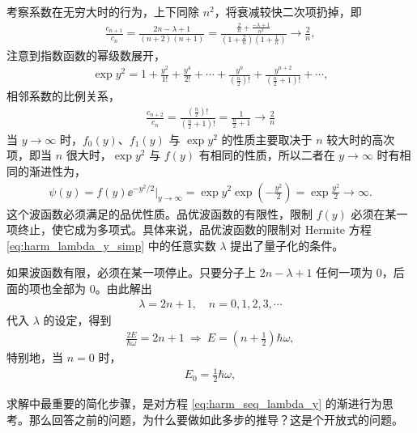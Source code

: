 考察系数在无穷大时的行为，上下同除 $n^2$，将衰减较快二次项扔掉，即
\begin{align}
    \frac{c_{n+1}}{c_n} = \frac{2n - \lambda + 1} { (n+2) (n+1)} = \frac{ \frac{2}{n} + \frac{-\lambda+1}{n^2} } { \left(1+\frac 2n\right) \left(1+\frac1n\right) } \rightarrow \frac 2n,
\end{align}
注意到指数函数的幂级数展开，
\begin{align}
    \exp y^2 = 1 + \frac{y^2}{1!} + \frac{y^4}{2!} + \cdots + \frac{y^n}{\left(\frac n2\right)!} + \frac{y^{n+2}}{\left(\frac n2 +1\right)!} + \cdots,
\end{align}
相邻系数的比例关系，
\begin{align}
    \frac{c_{n+2}}{c_n} = \frac{\left(\frac n2\right)!} {\left(\frac n2 + 1\right)!} = \frac1{\frac n2 +1} \rightarrow \frac 2n
\end{align}
当 $y\rightarrow\infty$ 时，$f_0(y)$、$f_1(y)$ 与 $\exp y^2$ 的性质主要取决于 $n$ 较大时的高次项，即当 $n$ 很大时，$\exp y^2$ 与 $f(y)$ 有相同的性质，所以二者在 $y\rightarrow\infty$ 时有相同的渐进性为，
\begin{align}
    \psi(y) = f(y) \ee^{-y^2/2} |_{y\rightarrow \infty} = \exp y^2 \exp \left(-\frac{y^2}2\right) = \exp \frac{y^2}2 \rightarrow \infty.
\end{align}
这个波函数必须满足的品优性质。品优波函数的有限性，限制 $f(y)$ 必须在某一项终止，使它成为多项式。具体来说，品优波函数的限制对 Hermite 方程
\eqref{eq:harm_lambda_y_simp}
中的任意实数 $\lambda$ 提出了量子化的条件。

如果波函数有限，必须在某一项停止。只要分子上 $2n - \lambda +1$ 任何一项为 0，后面的项也全部为 0。由此解出
\begin{align}
    \lambda = 2n +1, \quad n = 0, 1, 2, 3, \cdots
\end{align}
代入 $\lambda$ 的设定，得到
\begin{align}
    \frac{2E}{\hbar\omega} = 2n+1  \ \Rightarrow \ E = \left(n+\frac12\right)\hbar\omega,
\end{align}
特别地，当 $n=0$ 时，
\begin{align}
    E_0 = \frac12\hbar \omega,
\end{align}

求解中最重要的简化步骤，是对方程 \eqref{eq:harm_seq_lambda_y} 的渐进行为思考。那么回答之前的问题，为什么要做如此多步的推导？这是个开放式的问题。

